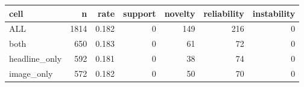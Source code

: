 \begin{tabular}{lrrrrrr}
\toprule
cell & n & rate & support & novelty & reliability & instability \\
\midrule
ALL & 1814 & 0.182 & 0 & 149 & 216 & 0 \\
both & 650 & 0.183 & 0 & 61 & 72 & 0 \\
headline\_only & 592 & 0.181 & 0 & 38 & 74 & 0 \\
image\_only & 572 & 0.182 & 0 & 50 & 70 & 0 \\
\bottomrule
\end{tabular}
